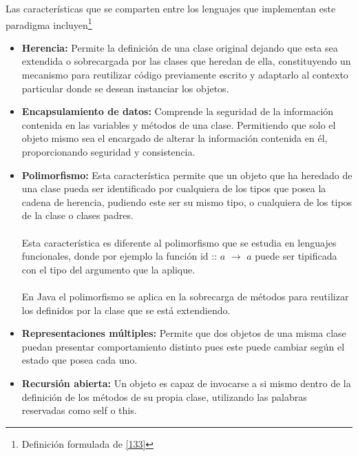 Las características que se comparten entre los lenguajes que implementan este paradigma incluyen\footnote{Definición formulada de \hyperlink{133}{[133]}} 
\begin{itemize}
    \item \textbf{Herencia:}
	 Permite la definición de una clase original dejando que esta sea extendida o sobrecargada por las clases que heredan de ella, constituyendo un mecanismo para reutilizar código previamente escrito y adaptarlo al contexto particular donde se desean instanciar los objetos.\\

    \item \textbf{Encapsulamiento de datos:} Comprende la seguridad de la información contenida en las variables y métodos de una clase. Permitiendo que solo el objeto mismo sea el encargado de alterar la información contenida en él, proporcionando seguridad y consistencia.\\

    \item  \textbf{Polimorfismo:} Esta característica permite que un objeto que ha heredado de una clase pueda ser identificado por cualquiera de los tipos que posea la cadena de herencia, pudiendo este ser su mismo tipo, o cualquiera de los tipos de la clase o clases padres.\\\\
Esta característica es diferente al polimorfismo que se estudia en lenguajes funcionales, donde por ejemplo la función \textsf{id} :: $a$ $\rightarrow$ $a$ puede ser tipificada con el tipo del argumento que la aplique.\\\\
 En Java el polimorfismo se aplica en la sobrecarga de métodos para reutilizar los definidos por la clase que se está extendiendo.\\

    \item \textbf{Representaciones múltiples:} Permite que dos objetos de una misma clase puedan presentar comportamiento distinto pues este puede cambiar según el estado que posea cada uno.\\

    \item \textbf{Recursión abierta:} Un objeto es capaz de invocarse a si mismo dentro de la definición de los métodos de su propia clase, utilizando las palabras reservadas como \textsf{self} o \textsf{this}.
\end{itemize}


